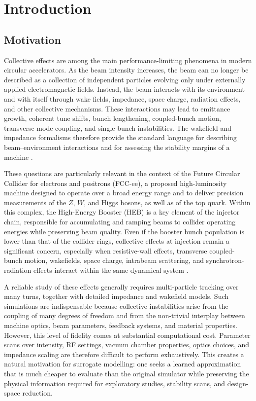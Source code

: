 
\section{Introduction}
\label{sec:introduction}

\subsection{Motivation}
Collective effects are among the main performance-limiting phenomena in modern circular accelerators. As the beam intensity increases, the beam can no longer be described as a collection of independent particles evolving only under externally applied electromagnetic fields. Instead, the beam interacts with its environment and with itself through wake fields, impedance, space charge, radiation effects, and other collective mechanisms. These interactions may lead to emittance growth, coherent tune shifts, bunch lengthening, coupled-bunch motion, transverse mode coupling, and single-bunch instabilities. The wakefield and impedance formalisms therefore provide the standard language for describing beam--environment interactions and for assessing the stability margins of a machine \cite{metral_wake_2021}.

These questions are particularly relevant in the context of the Future Circular Collider for electrons and positrons (FCC-ee), a proposed high-luminosity machine designed to operate over a broad energy range and to deliver precision measurements of the $Z$, $W$, and Higgs bosons, as well as of the top quark. Within this complex, the High-Energy Booster (HEB) is a key element of the injector chain, responsible for accumulating and ramping beams to collider operating energies while preserving beam quality. Even if the booster bunch population is lower than that of the collider rings, collective effects at injection remain a significant concern, especially when resistive-wall effects, transverse coupled-bunch motion, wakefields, space charge, intrabeam scattering, and synchrotron-radiation effects interact within the same dynamical system \cite{gibellieri_impact_fcc_heb}.

A reliable study of these effects generally requires multi-particle tracking over many turns, together with detailed impedance and wakefield models. Such simulations are indispensable because collective instabilities arise from the coupling of many degrees of freedom and from the non-trivial interplay between machine optics, beam parameters, feedback systems, and material properties. However, this level of fidelity comes at substantial computational cost. Parameter scans over intensity, RF settings, vacuum chamber properties, optics choices, and impedance scaling are therefore difficult to perform exhaustively. This creates a natural motivation for surrogate modelling: one seeks a learned approximation that is much cheaper to evaluate than the original simulator while preserving the physical information required for exploratory studies, stability scans, and design-space reduction.

